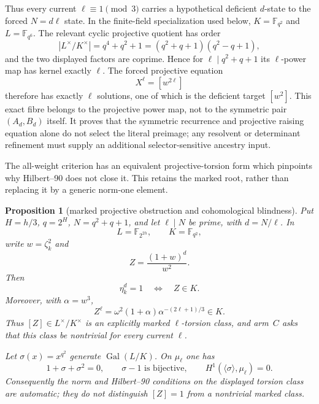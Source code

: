 \documentclass[11pt]{article}
\newtheorem{proposition}[theorem]{Proposition}
\theoremstyle{definition}
\theoremstyle{remark}
\begin{document}
Thus every current $\ell\equiv1\pmod3$ carries a hypothetical deficient
$d$-state to the forced $N=d\ell$ state.  In the finite-field specialization
used below, $K=\mathbb F_{q^2}$ and $L=\mathbb F_{q^6}$.  The relevant cyclic
projective quotient has order
\[
 |L^\times/K^\times|=q^4+q^2+1
 =(q^2+q+1)(q^2-q+1),
\]
and the two displayed factors are coprime.  Hence for
$\ell\mid q^2+q+1$ its $\ell$-power map has kernel exactly $\ell$.
The forced projective equation
\[
 X^\ell=[w^{2\ell}]
\]
therefore has exactly $\ell$ solutions, one of which is the deficient target
$[w^2]$.  This exact fibre belongs to the projective power map, not to the
symmetric pair $(A_d,B_d)$ itself.  It proves that the symmetric recurrence
and projective raising equation alone do not select the literal preimage;
any resolvent or determinant refinement must supply an additional
selector-sensitive ancestry input.

The all-weight criterion has an equivalent projective-torsion form which
pinpoints why Hilbert--90 does not close it.  This retains the marked root,
rather than replacing it by a generic norm-one element.

\begin{proposition}[marked projective obstruction and cohomological blindness]
\label{prop:c-projective}
Put $H=h/3$, $q=2^H$, $N=q^2+q+1$, and let
$\ell\mid N$ be prime, with $d=N/\ell$.  In
\[
 L=\mathbb F_{2^{2h}},\qquad K=\mathbb F_{q^2},
\]
write $w=\zeta_k^2$ and
\[
 Z=\frac{(1+w)^d}{w^2}.
\]
Then
\[
 \eta_k^d=1\quad\Longleftrightarrow\quad Z\in K.
\]
Moreover, with $\alpha=w^3$,
\[
 Z^\ell
 =\omega^2(1+\alpha)\alpha^{-(2\ell+1)/3}\in K.
\]
Thus $[Z]\in L^\times/K^\times$ is an explicitly marked
$\ell$-torsion class, and arm~$C$ asks that this class be nontrivial for
every current $\ell$.

Let $\sigma(x)=x^{q^2}$ generate $\operatorname{Gal}(L/K)$.  On
$\mu_\ell$ one has
\[
 1+\sigma+\sigma^2=0,
 \qquad \sigma-1\text{ is bijective},
 \qquad H^1(\langle\sigma\rangle,\mu_\ell)=0.
\]
Consequently the norm and Hilbert--90 conditions on the displayed torsion
class are automatic; they do not distinguish $[Z]=1$ from a nontrivial
marked class.
\end{proposition}
\end{document}
